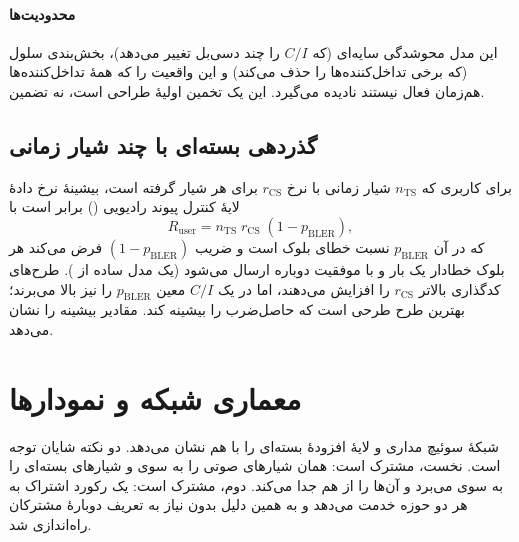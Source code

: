 \documentclass[11pt,a4paper]{article}
\begin{document}
\paragraph{محدودیت‌ها} این مدل محوشدگی سایه‌ای (که $C/I$ را چند دسی‌بل تغییر می‌دهد)،
بخش‌بندی سلول (که برخی تداخل‌کننده‌ها را حذف می‌کند) و این واقعیت را که همهٔ تداخل‌کننده‌ها
هم‌زمان فعال نیستند نادیده می‌گیرد. این یک تخمین اولیهٔ طراحی است، نه تضمین.

\begin{acnfigure}
  \caption{نسبت $C/I$ ردیف اول از \cref{eq:ci} بر حسب اندازهٔ خوشه برای دو نمای افت مسیر.
  خط افقی نسبت حفاظتی تقریبی  را نشان می‌دهد.}
  \label{fig:reuse}
\end{acnfigure}

\subsection{گذردهی بسته‌ای با چند شیار زمانی}
برای کاربری که $n_{\mathrm{TS}}$ شیار زمانی با نرخ $r_{\mathrm{CS}}$ برای هر شیار گرفته است،
بیشینهٔ نرخ دادهٔ لایهٔ کنترل پیوند رادیویی () برابر است با
\begin{equation}\label{eq:gprsrate}
  R_{\mathrm{user}} = n_{\mathrm{TS}}\; r_{\mathrm{CS}}\;(1-p_{\mathrm{BLER}}),
\end{equation}
که در آن $p_{\mathrm{BLER}}$ نسبت خطای بلوک است و ضریب $(1-p_{\mathrm{BLER}})$ فرض می‌کند هر بلوک
خطادار یک بار و با موفقیت دوباره ارسال می‌شود (یک مدل ساده از ). طرح‌های کدگذاری
بالاتر $r_{\mathrm{CS}}$ را افزایش می‌دهند، اما در یک $C/I$ معین $p_{\mathrm{BLER}}$ را نیز بالا
می‌برند؛ بهترین طرح طرحی است که حاصل‌ضرب را بیشینه کند.  مقادیر بیشینه را
نشان می‌دهد.

\begin{acnfigure}
  \caption{بیشینهٔ نرخ دادهٔ  هر کاربر بر حسب تعداد شیارهای زمانی
  ($p_{\mathrm{BLER}}=0$) برای دو طرح  و دو طرح . گذردهی واقعی به دلیل
  ارسال مجدد، اشتراک میان کاربران و سربار لایه‌های بالاتر کمتر است.}
  \label{fig:rates}
\end{acnfigure}

\section{معماری شبکه و نمودارها}\label{sec:architecture}
 شبکهٔ سوئیچ مداری  و لایهٔ افزودهٔ بسته‌ای  را با هم
نشان می‌دهد. دو نکته شایان توجه است. نخست،  مشترک است: همان 
شیارهای صوتی را به سوی  و شیارهای بسته‌ای را به سوی  می‌برد و
 آن‌ها را از هم جدا می‌کند. دوم،  مشترک است: یک رکورد اشتراک به هر دو
حوزه خدمت می‌دهد و به همین دلیل  بدون نیاز به تعریف دوبارهٔ مشترکان راه‌اندازی شد.
\end{document}
